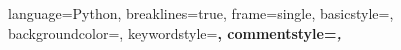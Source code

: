  {
  language=Python,
  breaklines=true,
  frame=single,
  basicstyle=\footnotesize\ttfamily,  
  backgroundcolor={\color{BlanchedAlmond}},
  keywordstyle=\bfseries\color{blue},
  commentstyle=\itshape\color{DarkViolet},  
}